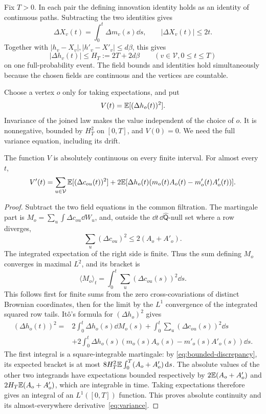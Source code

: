 Fix $T>0$. In each pair the defining innovation identity holds as an
identity of continuous paths. Subtracting the two identities gives
\[
 \Delta X_v(t)=\int_0^t\Delta m_v(s)\dd s,
 \qquad |\Delta X_v(t)|\le2t.
\]
Together with $|h_v-X_v|,|h'_v-X'_v|\le d\beta$, this gives
\begin{equation}\label{eq:bounded-discrepancy}
 |\Delta h_v(t)|\le H_T:=2T+2d\beta
       \qquad(v\in\mathcal V, 0\le t\le T)
\end{equation}
on one full-probability event. The field bounds and identities hold
simultaneously because the chosen fields are continuous and the
vertices are countable.

Choose a vertex $o$ only for taking expectations, and put
\[
 V(t)=\mathbb E[(\Delta h_o(t))^2].
\]
Invariance of the joined law makes the value independent of the
choice of $o$. It is nonnegative, bounded by $H_T^2$ on $[0,T]$,
and $V(0)=0$. We need the full variance equation, including its drift.

\begin{lemma}
\label{lem:copy-variance}
The function $V$ is absolutely continuous on every finite interval.
For almost every $t$,
\begin{equation}\label{eq:variance}
 V'(t)=\sum_{u\in\mathcal V}\mathbb E[(\Delta c_{ou}(t))^2]
       +2\mathbb E[\Delta h_o(t)(m_o(t)A_o(t)-m'_o(t)A'_o(t))].
\end{equation}
\end{lemma}

\begin{proof}
Subtract the two field equations in the common filtration. The
martingale part is $M_o=\sum_u\int\Delta c_{ou}\dd W_u$, and, outside
the $\dd t\,\dd\widehat{\mathsf Q}$-null set where a row diverges,
\[
 \sum_u(\Delta c_{ou})^2\le2(A_o+A'_o).
\]
The integrated expectation of the right side is finite. Thus the
sum defining $M_o$ converges in maximal $L^2$, and its bracket is
\[
 \langle M_o\rangle_t
       =\int_0^t\sum_u(\Delta c_{ou}(s))^2\dd s.
\]
This follows first for finite sums from the zero cross-covariations
of distinct Brownian coordinates, then for the limit by the
$L^1$ convergence of the integrated squared row tails. It\^o's
formula for $(\Delta h_o)^2$ gives
\begin{align*}
 (\Delta h_o(t))^2={}&2\int_0^t\Delta h_o(s)\dd M_o(s)
  +\int_0^t\sum_u(\Delta c_{ou}(s))^2\dd s\\
 &+2\int_0^t\Delta h_o(s)
          (m_o(s)A_o(s)-m'_o(s)A'_o(s))\dd s.
\end{align*}
The first integral is a square-integrable martingale: by
\eqref{eq:bounded-discrepancy}, its expected bracket is at most
$8H_T^2\mathbb E\int_0^T(A_o+A'_o)\,\mathrm d s$. The absolute values of the
other two integrands have expectations bounded respectively by
$2\mathbb E(A_o+A'_o)$ and $2H_T\mathbb E(A_o+A'_o)$, which are integrable in
time. Taking expectations therefore gives an integral of an
$L^1([0,T])$ function. This proves absolute continuity and its
almost-everywhere derivative~\eqref{eq:variance}.
\end{proof}


